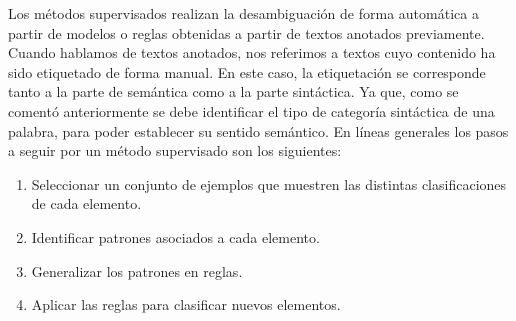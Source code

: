 Los métodos supervisados realizan la desambiguación de forma automática a partir de modelos o reglas obtenidas a partir de textos anotados previamente. Cuando hablamos de textos anotados, nos referimos a textos cuyo contenido ha sido etiquetado de forma manual. En este caso, la etiquetación se corresponde tanto a la parte de semántica como a la parte sintáctica. Ya que, como se comentó anteriormente se debe identificar el tipo de categoría sintáctica de una palabra, para poder establecer su sentido semántico. En líneas generales los pasos a seguir por un método supervisado son los siguientes:

  \begin{enumerate}
    \item Seleccionar un conjunto de ejemplos que muestren las distintas clasificaciones de cada elemento.
    \item Identificar patrones asociados a cada elemento.
    \item Generalizar los patrones en reglas.
    \item Aplicar las reglas para clasificar nuevos elementos.
  \end{enumerate}

